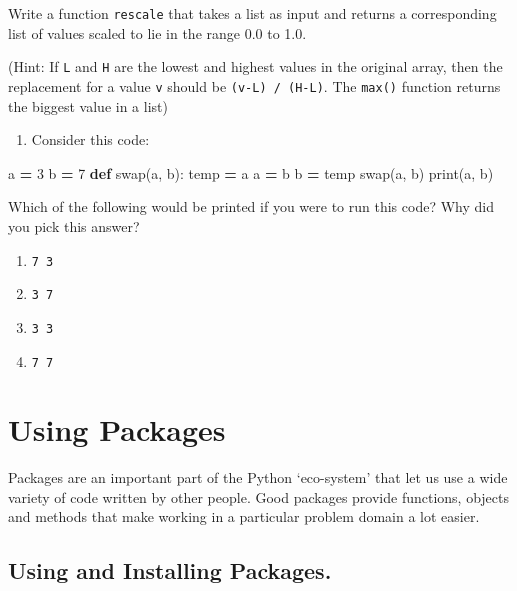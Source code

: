 \documentclass[]{book}
\newenvironment{Shaded}{\begin{snugshade}}{\end{snugshade}}
\newcommand{\BuiltInTok}[1]{#1}
\newcommand{\DecValTok}[1]{\textcolor[rgb]{0.00,0.00,0.81}{#1}}
\newcommand{\KeywordTok}[1]{\textcolor[rgb]{0.13,0.29,0.53}{\textbf{#1}}}
\newcommand{\NormalTok}[1]{#1}
\newcommand{\OperatorTok}[1]{\textcolor[rgb]{0.81,0.36,0.00}{\textbf{#1}}}
\providecommand{\tightlist}{%
  \setlength{\itemsep}{0pt}\setlength{\parskip}{0pt}}
\theoremstyle{definition}
\theoremstyle{definition}
\theoremstyle{definition}
\theoremstyle{remark}
\begin{document}
Write a function \texttt{rescale} that takes a list as input and returns
a corresponding list of values scaled to lie in the range 0.0 to 1.0.

(Hint: If \texttt{L} and \texttt{H} are the lowest and highest values in
the original array, then the replacement for a value \texttt{v} should
be \texttt{(v-L)\ /\ (H-L)}. The \texttt{max()} function returns the
biggest value in a list)

\begin{enumerate}
\def\labelenumi{\arabic{enumi}.}
\setcounter{enumi}{4}
\tightlist
\item
  Consider this code:
\end{enumerate}

\begin{Shaded}
\begin{Highlighting}[]
\NormalTok{a }\OperatorTok{=} \DecValTok{3}
\NormalTok{b }\OperatorTok{=} \DecValTok{7}
\KeywordTok{def}\NormalTok{ swap(a, b):}
\NormalTok{    temp }\OperatorTok{=}\NormalTok{ a}
\NormalTok{    a }\OperatorTok{=}\NormalTok{ b}
\NormalTok{    b }\OperatorTok{=}\NormalTok{ temp}
\NormalTok{swap(a, b)}
\BuiltInTok{print}\NormalTok{(a, b)}
\end{Highlighting}
\end{Shaded}

Which of the following would be printed if you were to run this code?
Why did you pick this answer?

\begin{enumerate}
\def\labelenumi{\arabic{enumi}.}
\tightlist
\item
  \texttt{7\ 3}
\item
  \texttt{3\ 7}
\item
  \texttt{3\ 3}
\item
  \texttt{7\ 7}
\end{enumerate}

\hypertarget{using-packages}{%
\chapter{Using Packages}\label{using-packages}}

Packages are an important part of the Python `eco-system' that let us
use a wide variety of code written by other people. Good packages
provide functions, objects and methods that make working in a particular
problem domain a lot easier.

\hypertarget{using-and-installing-packages.}{%
\section{Using and Installing
Packages.}\label{using-and-installing-packages.}}
\end{document}
